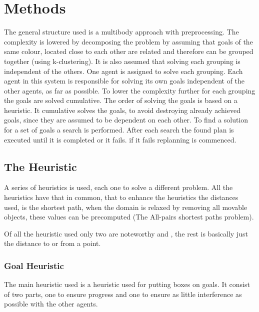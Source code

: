 \documentclass[letterpaper]{article}
\begin{document}
\section{Methods}
%		
%		
%		
	The general structure used is a multibody approach with preprocessing. The complexity is lowered by decomposing the problem by assuming that goals of the same colour, located close to each other are related and therefore can be grouped together (using k-clustering). It is also assumed that solving each grouping is independent of the others. One agent is assigned to solve each grouping.  Each agent in this system is responsible for solving its own goals independent of the other agents, as far as possible. 
	To lower the complexity further for each grouping the goals are solved cumulative. The order of solving the goals is based on a heuristic. It cumulative solves the goals, to avoid destroying already achieved goals, since they are assumed to be dependent on each other. To find a solution for a set of goals a search is performed. After each search the found plan is executed until it is completed or it fails. if it fails replanning is commenced.

 
	\subsection{The Heuristic}
		A series of heuristics is used, each one to solve a different problem. All the heuristics have that in common, that to enhance the heuristics the distances used, is the shortest path, when the domain is relaxed by removing all movable objects, these values can be precomputed (The All-pairs shortest paths problem).
		
		Of all the heuristic used only two are noteworthy  and , the rest is basically just the distance to or from a point.
		\subsubsection{Goal Heuristic}\label{Goal1}
			The main heuristic used is a heuristic used for putting boxes on goals. It consist of two parts, one to ensure progress and one to ensure as little interference as possible with the other agents.
			
\end{document}
